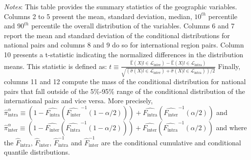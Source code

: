  \begin{table}[H]
    \centering
    \caption{Summary statistics: Geographic Variables }
    \label{tab: app_prop_score_sum_stats}
    \begin{spacing}{1}
    \end{spacing}
    \parbox{1\textwidth}{
    \vspace{10pt}
    \begin{spacing}{1} 
        {\footnotesize 
        \textit{Notes}: This table provides the summary statistics of the geographic variables. Columns 2 to 5 present the mean, standard deviation, median, $10^{th}$ percentile and $90^{th}$ percentile the overall distribution of the variables. Columns 6 and 7 report the mean and standard deviation of the conditional distributions for national pairs and columns 8 and 9 do so for international region pairs. Column 10 presents a t-statistic indicating the normalized differences in the distribution means. This statistic is defined as: 
        $t\equiv
            \frac{\hat{\mathbb{E}}(X|l\in\mathcal{L}_{\text{inter}})-\hat{\mathbb{E}}(X|l \in \mathcal{L}_{\text{intra}})}
                 {\sqrt{\left(\hat{\sigma}(X|l \in \mathcal{L}_{\text{inter}}) + \hat{\sigma}(X|l \in \mathcal{L}_{\text{intra}})\right)/2}}$  
        Finally, columns 11 and 12 compute the mass of the conditional distribution for national pairs that fall outside of the 5\%-95\% range of the conditional distribution of the international pairs and vice versa. More precisely, 
        $\hat{\pi}_{\text{intra}}^{\alpha} \equiv 
            \left(1 - \hat{F_\text{intra}}\left(\hat{F_\text{inter}}^{-1}\left(1-\alpha/2\right)\right)\right) 
            + \hat{F_\text{intra}}\left(\hat{F_\text{inter}}^{-1}\left(\alpha/2\right)\right)$ and 
        $\hat{\pi}_{\text{inter}}^{\alpha} \equiv 
            \left(1 - \hat{F_\text{inter}}\left(\hat{F_\text{intra}}^{-1}\left(1-\alpha/2\right)\right)\right) 
            + \hat{F_\text{inter}}\left(\hat{F_\text{intra}}^{-1}\left(\alpha/2\right)\right)$ and where the $\hat{F}_{\text{intra}}$, $\hat{F}_{\text{inter}}$, $\hat{F}^{-1}_{\text{intra}}$ and $\hat{F}^{-1}_{\text{inter}}$ are the conditional cumulative and conditional quantile distributions.}
        \end{spacing}}
\end{table}

